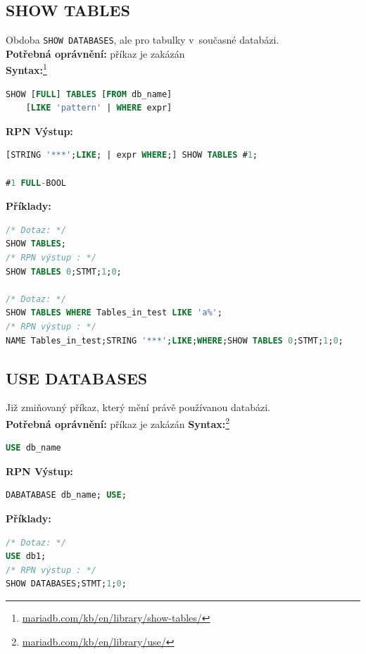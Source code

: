 \subsection{SHOW TABLES} \label{subsec:6:showtbl}
Obdoba \texttt{SHOW DATABASES}, ale pro tabulky v~současné databázi. \\

\textbf{Potřebná oprávnění:} příkaz je zakázán \\

\textbf{Syntax:}\footnote{\url{mariadb.com/kb/en/library/show-tables/}}
\begin{lstlisting}[language=sql]
SHOW [FULL] TABLES [FROM db_name]
    [LIKE 'pattern' | WHERE expr]
\end{lstlisting}
\vspace*{\baselineskip}
\textbf{RPN Výstup:}
\begin{lstlisting}[language=sql]
[STRING '***';LIKE; | expr WHERE;] SHOW TABLES #1;

#1 FULL-BOOL
\end{lstlisting}
\vspace*{\baselineskip}
\textbf{Příklady:}
\begin{lstlisting}[language=sql]
/* Dotaz: */
SHOW TABLES;
/* RPN výstup : */
SHOW TABLES 0;STMT;1;0;

/* Dotaz: */
SHOW TABLES WHERE Tables_in_test LIKE 'a%';
/* RPN výstup : */
NAME Tables_in_test;STRING '***';LIKE;WHERE;SHOW TABLES 0;STMT;1;0;
\end{lstlisting}

\subsection{USE DATABASES} \label{subsec:6:usedb}
Již zmiňovaný příkaz, který mění právě používanou databázi. \\

\textbf{Potřebná oprávnění:} příkaz je zakázán 
\newpage
\textbf{Syntax:}\footnote{\url{mariadb.com/kb/en/library/use/}}
\begin{lstlisting}[language=sql]
USE db_name
\end{lstlisting}
\vspace*{\baselineskip}
\textbf{RPN Výstup:}
\begin{lstlisting}[language=sql]
DABATABASE db_name; USE;
\end{lstlisting}
\vspace*{\baselineskip}
\textbf{Příklady:}
\begin{lstlisting}[language=sql]
/* Dotaz: */
USE db1;
/* RPN výstup : */
SHOW DATABASES;STMT;1;0;
\end{lstlisting}

